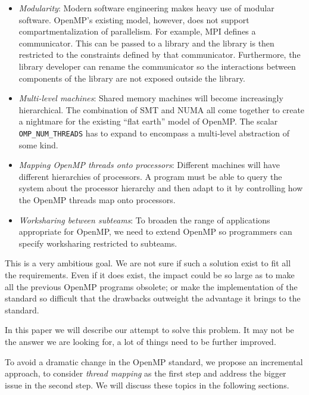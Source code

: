 \begin{itemize}

  \item \emph{Modularity}: Modern software engineering makes heavy use of
  modular software.  OpenMP's existing model, however, does not support
  compartmentalization of parallelism.  For example, MPI defines a
  communicator.  This can be passed to a library and the library is then
  restricted to the constraints defined by that communicator.  Furthermore, the
  library developer can rename the communicator so the interactions between
  components of the library are not exposed outside the library. 

  \item \emph{Multi-level machines}: Shared memory machines will become
  increasingly hierarchical.  The combination of SMT and NUMA all come together
  to create a nightmare for the existing ``flat earth'' model of OpenMP. The
  scalar \texttt{OMP\_NUM\_THREADS} has to expand to encompass a multi-level
  abstraction of some kind. 

  \item \emph{Mapping OpenMP threads onto processors}: Different machines will
  have different hierarchies of processors.  A program must be able to query
  the system about the processor hierarchy and then adapt to it  by controlling
  how the OpenMP threads map onto processors.

  \item \emph{Worksharing between subteams}: To broaden the range of
  applications appropriate for OpenMP, we need to extend OpenMP so programmers
  can specify worksharing restricted to subteams.  

\end{itemize}

This is a very ambitious goal. We are not sure if such a solution exist to fit
all the requirements. Even if it does exist, the impact could be so large as to
make all the previous OpenMP programs obsolete; or make the implementation of
the standard so difficult that the drawbacks outweight the advantage it brings
to the standard.

In this paper we will describe our attempt to solve this problem. It may not be
the answer we are looking for, a lot of things need to be further improved.

To avoid a dramatic change in
the OpenMP standard, we propose an incremental approach, to consider
\emph{thread mapping} as the first step and address the bigger issue in the
second step. We will discuss these topics in the following sections.

